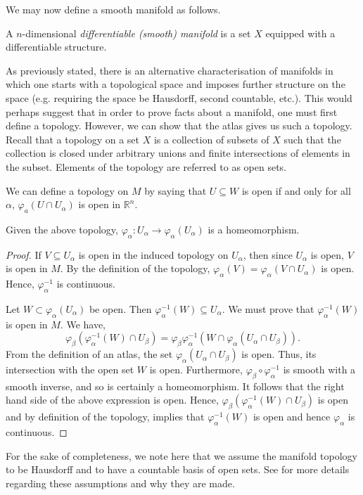 We may now define a smooth manifold as follows.
\begin{definition}
A $n$-dimensional \textit{differentiable (smooth) manifold} is a set $X$ equipped with a differentiable structure.
\end{definition}
As previously stated, there is an alternative characterisation of manifolds in which one starts with a topological space and imposes further structure on the space (e.g. requiring the space be Hausdorff, second countable, etc.). This would perhaps suggest that in order to prove facts about a manifold, one must first define a topology. However, we can show that the atlas gives us such a topology.\\

Recall that a topology on a set $X$ is a collection of subsets of $X$ such that the collection is closed under arbitrary unions and finite intersections of elements in the subset. Elements of the topology are referred to as open sets.

We can define a topology on $M$ by saying that $U\subseteq W$ is open if and only for all $\alpha$, $\varphi_a(U\cap U_\alpha)$ is open in $\mathbb{R}^n$.

\begin{proposition}
Given the above topology, $\varphi_\alpha :U_\alpha\to\varphi_\alpha(U_\alpha)$ is a homeomorphism.
\end{proposition}
\begin{proof}
If $V\subseteq U_\alpha$ is open in the induced topology on $U_\alpha$, then since $U_\alpha$ is open, $V$ is open in $M$. By the definition of the topology, $\varphi_\alpha(V)=\varphi_\alpha(V\cap U_\alpha)$ is open. Hence, $\varphi^{-1}_\alpha$ is continuous.

Let $W\subset\varphi_\alpha(U_\alpha)$ be open. Then $\varphi_\alpha^{-1}(W)\subseteq U_\alpha$. We must prove that $\varphi_\alpha^{-1}(W)$ is open in $M$. We have,
\[
\varphi_\beta(\varphi_\alpha^{-1}(W)\cap U_\beta)=\varphi_\beta\varphi_\alpha^{-1}\left(W\cap\varphi_\alpha(U_\alpha\cap U_\beta)\right).
\]
From the definition of an atlas, the set $\varphi_\alpha(U_\alpha\cap U_\beta)$ is open. Thus, its intersection with the open set $W$ is open. Furthermore, $\varphi_\beta\circ\varphi_\alpha^{-1}$ is smooth with a smooth inverse, and so is certainly a homeomorphism. It follows that the right hand side of the above expression is open. Hence, $\varphi_\beta(\varphi_\alpha^{-1}(W)\cap U_\beta)$ is open and by definition of the topology, implies that $\varphi_\alpha^{-1}(W)$ is open and hence $\varphi_\alpha$ is continuous.  
\end{proof}
For the sake of completeness, we note here that we assume the manifold topology to be Hausdorff and to have a countable basis of open sets. See \cite{MR2766102} for more details regarding these assumptions and why they are made.

